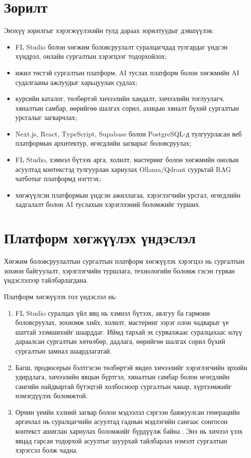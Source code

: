 \section*{Зорилт}
Энэхүү зорилгыг хэрэгжүүлэхийн тулд дараах зорилтуудыг дэвшүүлэв:
\begin{itemize}
    \item FL Studio болон хөгжим боловсруулалт суралцагчдад тулгардаг үндсэн хүндрэл, онлайн сургалтын хэрэгцээг тодорхойлох;
    \item ижил төстэй сургалтын платформ, AI туслах платформ болон хөгжмийн AI судалгааны ажлуудыг харьцуулан судлах;
    \item курсийн каталог, төлбөртэй хичээлийн хандалт, хичээлийн тоглуулагч, хяналтын самбар, өөрийгөө шалгах сорил, ахицын хяналт бүхий сургалтын урсгалыг загварчлах;
    \item Next.js, React, TypeScript, Supabase болон PostgreSQL-д тулгуурласан веб платформын архитектур, өгөгдлийн загварыг боловсруулах;
    \item FL Studio, хэмнэл бүтээх арга, холилт, мастеринг болон хөгжмийн онолын асуултад контекстэд тулгуурлан хариулах Ollama/Qdrant суурьтай RAG чатботыг платформд нэгтгэх;
    \item хөгжүүлсэн платформын үндсэн ажиллагаа, хэрэглэгчийн урсгал, өгөгдлийн хадгалалт болон AI туслахын хэрэглээний боломжийг турших.
\end{itemize}

\section*{Платформ хөгжүүлэх үндэслэл}
Хөгжим боловсруулалтын сургалтын платформ хөгжүүлэх хэрэгцээ нь сургалтын зохион байгуулалт, хэрэглэгчийн туршлага, технологийн боломж гэсэн гурван үндэслэлээр тайлбарлагдана.

Платформ хөгжүүлэх гол үндэслэл нь:
\begin{enumerate}
    \item FL Studio суралцах үйл явц нь хэмнэл бүтээх, аялгуу ба гармони боловсруулах, зохиомж хийх, холилт, мастеринг зэрэг олон чадварыг үе шаттай эзэмшихийг шаарддаг. Иймд тархай эх сурвалжаас суралцахаас илүү дараалсан сургалтын хөтөлбөр, дадлага, өөрийгөө шалгах сорил бүхий сургалтын замнал шаардлагатай.
    \item Багш, продюсерын бэлтгэсэн төлбөртэй видео хичээлийг хэрэглэгчийн эрхийн удирдлага, хичээлийн явцын бүртгэл, хяналтын самбар болон өгөгдлийн сангийн найдвартай бүтэцтэй холбосноор сургалтын чанар, хүртээмжийг нэмэгдүүлэх боломжтой.
    \item Орчин үеийн хэлний загвар болон мэдээлэл сэргээн баяжуулсан генерацийн аргачлал нь суралцагчийн асуултад гаднын мэдлэгийн сангаас сонгосон контекст ашиглан хариулах боломжийг бүрдүүлж байна \cite{attention_vaswani_2017,rag_lewis_2020,dpr_karpukhin_2020}. Энэ нь хичээл үзэх явцад гарсан тодорхой асуултыг шуурхай тайлбарлах нэмэлт сургалтын хэрэгсэл болж чадна.
\end{enumerate}

